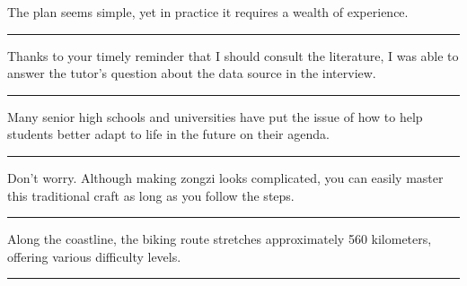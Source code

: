 \documentclass[11pt,a4paper]{article}
\newcommand{\num}[1]{\makebox[1.9em][r]{#1.}\hspace{0.3em}}
\newcommand{\wline}{\noindent\rule{\linewidth}{0.4pt}}
\begin{document}
\vspace{0.35em}\vspace{0.15em}

\begin{minipage}{\linewidth}

\num{9}The plan seems simple, yet in practice it requires a wealth of experience.

\vspace{0.25em}

\wline

\end{minipage}

\begin{minipage}{\linewidth}

\num{10}Thanks to your timely reminder that I should consult the literature, I was able to answer the tutor’s question about the data source in the interview.

\vspace{0.25em}

\wline

\end{minipage}

\begin{minipage}{\linewidth}

\num{11}Many senior high schools and universities have put the issue of how to help students better adapt to life in the future on their agenda.

\vspace{0.25em}

\wline

\end{minipage}

\begin{minipage}{\linewidth}

\num{12}Don’t worry. Although making zongzi looks complicated, you can easily master this traditional craft as long as you follow the steps.

\vspace{0.25em}

\wline

\end{minipage}

\vspace{0.35em}\vspace{0.15em}

\begin{minipage}{\linewidth}

\num{13}Along the coastline, the biking route stretches approximately 560 kilometers, offering various difficulty levels.

\vspace{0.25em}

\wline

\end{minipage}
\end{document}
